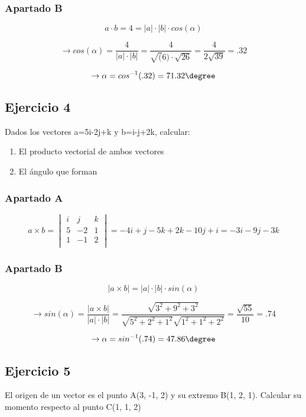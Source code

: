 \subsubsection{Apartado B}
  $$
  a\cdot b = 4 = \left\lvert a\right\rvert
  \cdot \left\lvert b\right\rvert
  \cdot cos(\alpha)
  $$

  $$
  \rightarrow cos(\alpha) = \frac{4}{
    \left\lvert a\right\rvert
    \cdot \left\lvert b\right\rvert
  } = \frac{4}{\sqrt(6)\cdot \sqrt{26}}
  = \frac{4}{2\sqrt{39}} = .32
  $$

  $$
  \rightarrow \alpha = cos^{-1}(.32) = 71.32\degree
  $$

\subsection{Ejercicio 4}
Dados los vectores a=5i-2j+k y b=i-j+2k, calcular:
\begin{enumerate}[label=\Alph*)]
  \item El producto vectorial de ambos vectores
  \item El ángulo que forman
\end{enumerate}

\subsubsection{Apartado A}
  $$
  a\times b = 
  \begin{vmatrix}
    i & j & k \\
    5 &-2 & 1 \\
    1 &-1 & 2 \\
  \end{vmatrix}
  = -4i + j -5k +2k -10j +i
  = -3i -9j -3k
  $$

\subsubsection{Apartado B}
  $$
  \left\lvert a\times b\right\rvert  = \left\lvert a\right\rvert
  \cdot \left\lvert b\right\rvert
  \cdot sin(\alpha)
  $$

  $$
  \rightarrow sin(\alpha) = \frac{
    \left\lvert a\times b\right\rvert
  }{
    \left\lvert a\right\rvert 
    \cdot \left\lvert b\right\rvert 
  } = \frac{\sqrt{3^2 + 9^2 + 3^2}}{
    \sqrt{5^2 + 2^2 + 1^2}\sqrt{1^2 + 1^2 + 2^2}
  } = \frac{\sqrt{55}}{10} = .74
  $$

  $$
  \rightarrow \alpha = sin^{-1}(.74) =47.86\degree
  $$

\subsection{Ejercicio 5}
El origen de un vector es el punto A(3, -1, 2) y
su extremo B(1, 2, 1). Calcular su momento
respecto al punto C(1, 1, 2)

